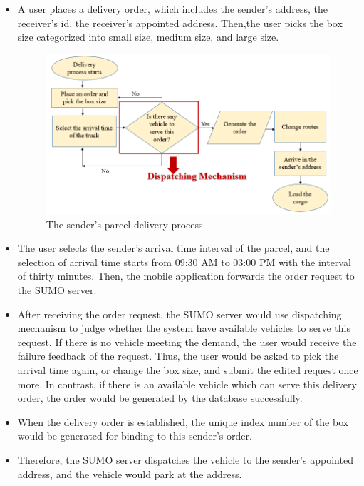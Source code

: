 \documentclass[12pt]{ksthesis}
\begin{document}
\begin{thesis}
{\begin{itemize}
\item
A user places a delivery order, which includes the sender’s address, the receiver’s id, the receiver’s appointed address. Then,the user picks the box size categorized into small size, medium size, and large size.


\begin{figure}[H]
\centering
\includegraphics[width=1.0\textwidth]{./Thesis_figures/F5-1_sender_delivery_process.PNG}
\caption{\large The sender’s parcel delivery process.}
\vspace{0.5cm}
\label{Fig:sender_process}
\end{figure}


\item
The user selects the sender’s arrival time interval of the parcel, and the selection of arrival time starts from 09:30 AM to 03:00 PM with the interval of thirty minutes. Then, the mobile application forwards the order request to the SUMO server.

\item
After receiving the order request, the SUMO server would use dispatching mechanism to judge whether the system have available vehicles to serve this request. If there is no vehicle meeting the demand, the user would receive the failure feedback of the request. Thus, the user would be asked to pick the arrival time again, or change the box size, and submit the edited request once more.
In contrast, if there is an available vehicle which can serve this delivery order, the order would be generated by the database successfully.

\item
When the delivery order is established, the unique index number of the box would be generated for binding to this sender’s order.

\item
Therefore, the SUMO server dispatches the vehicle to the sender’s appointed address, and the vehicle would park at the address.


\end{itemize}}
\end{thesis}
\end{document}
